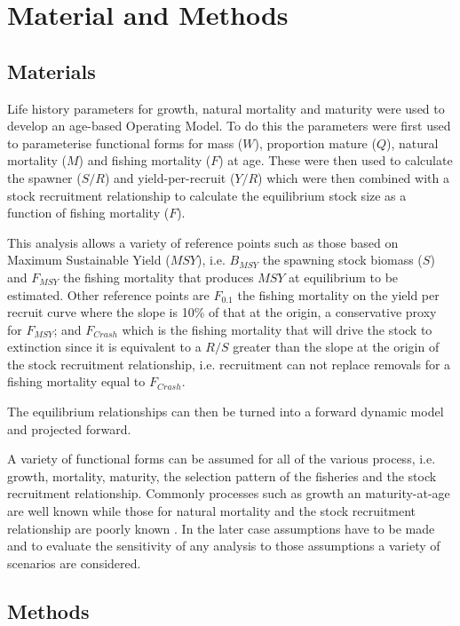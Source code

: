 \documentclass[preprint,12pt]{elsarticle}
\begin{document}
\section{Material and Methods}
\subsection{Materials}


Life history parameters for growth, natural mortality and maturity were used to develop an age-based Operating Model. To do this the parameters were first used to parameterise functional forms for mass ($W$), proportion mature ($Q$), natural mortality ($M$) and fishing mortality ($F$) at age. These were then used to calculate the  spawner ($S/R$) and yield-per-recruit ($Y/R$) which were then combined with a stock recruitment relationship \cite{sissenwine1987alternative} to calculate the equilibrium stock size as a function of fishing mortality ($F$). 

This analysis allows a variety of reference points such as those based on Maximum Sustainable Yield ($MSY$), i.e. $B_{MSY}$ the spawning stock biomass ($S$) and $F_{MSY}$ the fishing mortality that produces $MSY$ at equilibrium to be estimated. Other reference points are $F_{0.1}$ the fishing mortality on the yield per recruit curve where the slope is 10\% of that at the origin, a conservative proxy for $F_{MSY}$; and
$F_{Crash}$ which is the fishing mortality that will drive the stock to extinction since it is equivalent to a $R/S$ greater than the slope at the origin of the stock recruitment relationship, i.e. recruitment can not replace removals for a fishing mortality equal to $F_{Crash}$.  

The equilibrium relationships can then be turned into a forward dynamic model and projected forward.

A variety of functional forms can be assumed for all of the various process, i.e. growth, mortality, maturity, the selection pattern of the fisheries and the stock recruitment relationship. Commonly processes such as growth an maturity-at-age are well known while those for natural mortality and the stock recruitment relationship are poorly known \cite{michielsens2004bayesian}. In the later case assumptions have to be made and to evaluate the sensitivity of any analysis to those assumptions a variety of scenarios are considered. 

\subsection{Methods}
\end{document}
